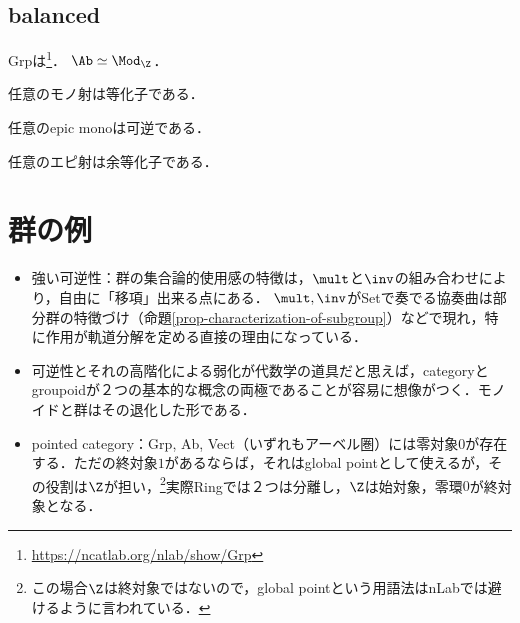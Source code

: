 \documentclass[uplatex,dvipdfmx]{jsreport}
\begin{document}
\subsection{balanced}

\begin{tcolorbox}[colframe=ForestGreen, colback=ForestGreen!10!white,breakable,colbacktitle=ForestGreen!40!white,coltitle=black,fonttitle=\bfseries\sffamily,
title=]
    Grpは\footnote{\url{https://ncatlab.org/nlab/show/Grp}}．
    $\Ab\simeq\Mod_\Z$．
\end{tcolorbox}

\begin{proposition}
    任意のモノ射は等化子である．
\end{proposition}

\begin{corollary}
    任意のepic monoは可逆である．
\end{corollary}

\begin{corollary}
    任意のエピ射は余等化子である．
\end{corollary}

\section{群の例}

\begin{tcolorbox}[colframe=ForestGreen, colback=ForestGreen!10!white,breakable,colbacktitle=ForestGreen!40!white,coltitle=black,fonttitle=\bfseries\sffamily,
title=]
    \begin{itemize}
        \item 強い可逆性：群の集合論的使用感の特徴は，$\mult$と$\inv$の組み合わせにより，自由に「移項」出来る点にある．
        $\mult,\inv$がSetで奏でる協奏曲は部分群の特徴づけ（命題\ref{prop-characterization-of-subgroup}）などで現れ，特に作用が軌道分解を定める直接の理由になっている．
        \item 可逆性とそれの高階化による弱化が代数学の道具だと思えば，categoryとgroupoidが２つの基本的な概念の両極であることが容易に想像がつく．モノイドと群はその退化した形である．
        \item pointed category：Grp, Ab, Vect（いずれもアーベル圏）には零対象$0$が存在する．ただの終対象$1$があるならば，それはglobal pointとして使えるが，その役割は$\Z$が担い，\footnote{この場合$\Z$は終対象ではないので，global pointという用語法はnLabでは避けるように言われている．}実際Ringでは２つは分離し，$\Z$は始対象，零環$0$が終対象となる．
    \end{itemize}
\end{tcolorbox}
\end{document}
